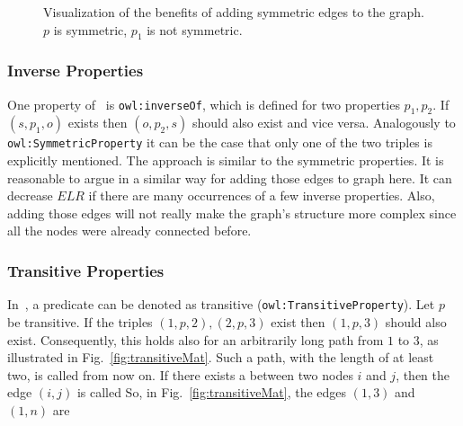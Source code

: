 \begin{figure}[h]
	\centering
	\hfill
	\caption{Visualization of the benefits of adding symmetric edges to the graph. $p$ is symmetric, $p_1$ is not symmetric.}
	\label{}
\end{figure}

\subsubsection{Inverse Properties}\label{sec:approachInverse}

One property of~\cite{owl} is {\tt owl:inverseOf}, which is defined for two properties $p_1, p_2$. If $(s,p_1,o)$ exists then $(o,p_2,s)$ should also exist and vice versa. Analogously to {\tt owl:SymmetricProperty} it can be the case that only one of the two triples is explicitly mentioned. The approach is similar to the symmetric properties. It is reasonable to argue in a similar way for adding those edges to graph here. It can decrease $ELR$ if there are many occurrences of a few inverse properties. Also, adding those edges will not really make the graph's structure more complex since all the nodes were already connected before. 


\subsubsection{Transitive Properties}\label{sec:approachTransitive}


In~\cite{owl}, a predicate can be denoted as transitive ({\tt owl:TransitiveProperty}). Let $p$ be transitive. If the triples $(1,p,2),(2,p,3)$ exist then $(1,p,3)$ should also exist. Consequently, this holds also for an arbitrarily long path from $1$ to $3$, as illustrated in Fig.~\ref{fig:transitiveMat}. Such a path, with the length of at least two, is called \tp from now on. If there exists a \tp between two nodes $i$ and $j$, then the edge $(i,j)$ is called \dtpp So, in Fig.~\ref{fig:transitiveMat}, the edges $(1,3)$ and $(1,n)$ are \dtpsp

